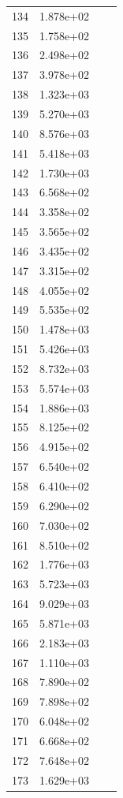 \documentclass[12pt]{article}
\begin{document}
\begin{longtable}{@{}cccc@{}}
134 & 1.878e+02 &  &  \\
135 & 1.758e+02 &  &  \\
136 & 2.498e+02 &  &  \\
137 & 3.978e+02 &  &  \\
138 & 1.323e+03 &  &  \\
139 & 5.270e+03 &  &  \\
140 & 8.576e+03 &  &  \\
141 & 5.418e+03 &  &  \\
142 & 1.730e+03 &  &  \\
143 & 6.568e+02 &  &  \\
144 & 3.358e+02 &  &  \\
145 & 3.565e+02 &  &  \\
146 & 3.435e+02 &  &  \\
147 & 3.315e+02 &  &  \\
148 & 4.055e+02 &  &  \\
149 & 5.535e+02 &  &  \\
150 & 1.478e+03 &  &  \\
151 & 5.426e+03 &  &  \\
152 & 8.732e+03 &  &  \\
153 & 5.574e+03 &  &  \\
154 & 1.886e+03 &  &  \\
155 & 8.125e+02 &  &  \\
156 & 4.915e+02 &  &  \\
157 & 6.540e+02 &  &  \\
158 & 6.410e+02 &  &  \\
159 & 6.290e+02 &  &  \\
160 & 7.030e+02 &  &  \\
161 & 8.510e+02 &  &  \\
162 & 1.776e+03 &  &  \\
163 & 5.723e+03 &  &  \\
164 & 9.029e+03 &  &  \\
165 & 5.871e+03 &  &  \\
166 & 2.183e+03 &  &  \\
167 & 1.110e+03 &  &  \\
168 & 7.890e+02 &  &  \\
169 & 7.898e+02 &  &  \\
170 & 6.048e+02 &  &  \\
171 & 6.668e+02 &  &  \\
172 & 7.648e+02 &  &  \\
173 & 1.629e+03 &  &  \\

\end{longtable}
\end{document}
